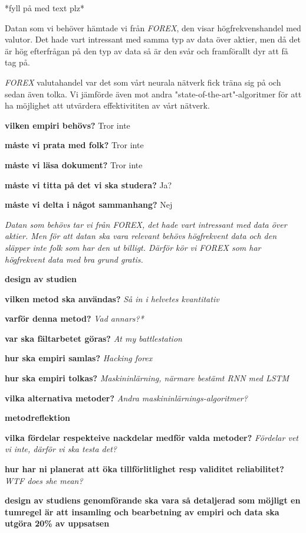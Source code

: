 *fyll på med text plz*

Datan som vi behöver hämtade vi från \textit{FOREX}, den visar högfrekvenshandel med valutor. Det hade vart intressant med samma typ av data över aktier, men då det är hög efterfrågan på den typ av data så är den svår och framförallt dyr att få tag på. 

\textit{FOREX} valutahandel var det som vårt neurala nätverk fick träna sig på och sedan även tolka. Vi jämförde även mot andra "state-of-the-art"-algoritmer för att ha möjlighet att utvärdera effektivititen av vårt nätverk.

\textbf{vilken empiri behövs?} Tror inte

\textbf{måste vi prata med folk?} Tror inte

\textbf{måste vi läsa dokument?} Tror inte

\textbf{måste vi titta på det vi ska studera?} Ja?

\textbf{måste vi delta i något sammanhang?} Nej

\textit{Datan som behövs tar vi från FOREX, det hade vart intressant med data över aktier. Men för att datan ska vara relevant behövs högfrekvent data och den släpper inte folk som har den ut billigt. Därför kör vi FOREX som har högfrekvent data med bra grund gratis.}

\textbf{design av studien}

\textbf{vilken metod ska användas?}
\textit{Så in i helvetes kvantitativ}

\textbf{varför denna metod?}
\textit{Vad annars?*}

\textbf{var ska fältarbetet göras?}
\textit{At my battlestation}

\textbf{hur ska empiri samlas?}
\textit{Hacking forex}

\textbf{hur ska empiri tolkas?}
\textit{Maskininlärning, närmare bestämt RNN med LSTM}

\textbf{vilka alternativa metoder?}
\textit{Andra maskininlärnings-algoritmer?}

\textbf{metodreflektion}

\textbf{vilka fördelar respekteive nackdelar medför valda metoder?}
\textit{Fördelar vet vi inte, därför vi ska testa det?}

\textbf{hur har ni planerat att öka tillförlitlighet resp validitet reliabilitet?}
\textit{WTF does she mean?}

\textbf{design av studiens genomförande ska vara så detaljerad som möjligt en tumregel är att insamling och bearbetning av empiri och data ska utgöra 20\% av uppsatsen}
